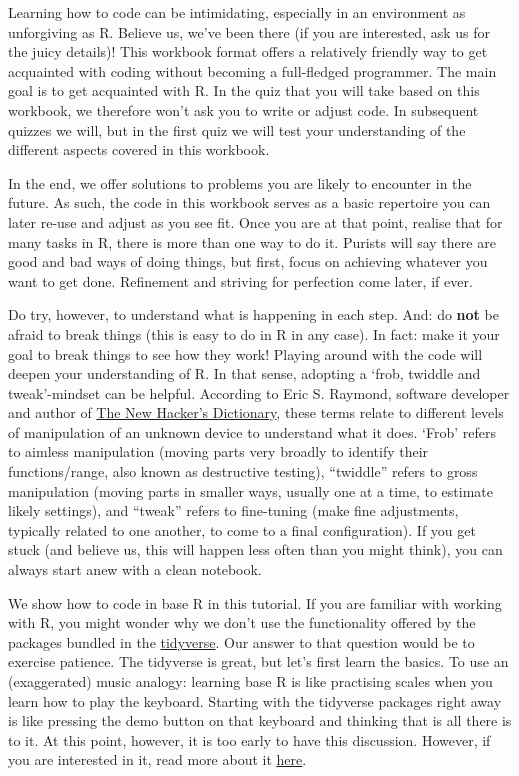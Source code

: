 \documentclass[
]{article}
\begin{document}
Learning how to code can be intimidating, especially in an environment
as unforgiving as R. Believe us, we've been there (if you are
interested, ask us for the juicy details)! This workbook format offers a
relatively friendly way to get acquainted with coding without becoming a
full-fledged programmer. The main goal is to get acquainted with R. In
the quiz that you will take based on this workbook, we therefore won't
ask you to write or adjust code. In subsequent quizzes we will, but in
the first quiz we will test your understanding of the different aspects
covered in this workbook.

In the end, we offer solutions to problems you are likely to encounter
in the future. As such, the code in this workbook serves as a basic
repertoire you can later re-use and adjust as you see fit. Once you are
at that point, realise that for many tasks in R, there is more than one
way to do it. Purists will say there are good and bad ways of doing
things, but first, focus on achieving whatever you want to get done.
Refinement and striving for perfection come later, if ever.

Do try, however, to understand what is happening in each step. And: do
\textbf{not} be afraid to break things (this is easy to do in R in any
case). In fact: make it your goal to break things to see how they work!
Playing around with the code will deepen your understanding of R. In
that sense, adopting a `frob, twiddle and tweak'-mindset can be helpful.
According to Eric S. Raymond, software developer and author of
\href{https://www.gutenberg.org/files/3008/3008-h/3008-h.htm}{The New
Hacker's Dictionary}, these terms relate to different levels of
manipulation of an unknown device to understand what it does. `Frob'
refers to aimless manipulation (moving parts very broadly to identify
their functions/range, also known as destructive testing), ``twiddle''
refers to gross manipulation (moving parts in smaller ways, usually one
at a time, to estimate likely settings), and ``tweak'' refers to
fine-tuning (make fine adjustments, typically related to one another, to
come to a final configuration). If you get stuck (and believe us, this
will happen less often than you might think), you can always start anew
with a clean notebook.

We show how to code in base R in this tutorial. If you are familiar with
working with R, you might wonder why we don't use the functionality
offered by the packages bundled in the
\href{https://www.tidyverse.org}{tidyverse}. Our answer to that question
would be to exercise patience. The tidyverse is great, but let's first
learn the basics. To use an (exaggerated) music analogy: learning base R
is like practising scales when you learn how to play the keyboard.
Starting with the tidyverse packages right away is like pressing the
demo button on that keyboard and thinking that is all there is to it. At
this point, however, it is too early to have this discussion. However,
if you are interested in it, read more about it
\href{https://github.com/matloff/TidyverseSkeptic}{here}.
\end{document}
